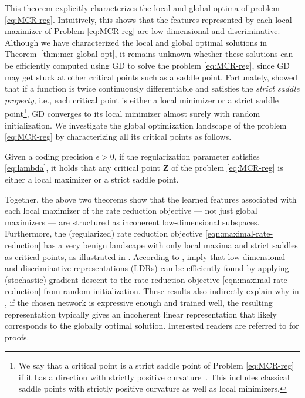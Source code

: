 \documentclass[../../book-main.tex]{subfiles}
\begin{document}
This theorem explicitly characterizes the local and global optima of problem \eqref{eq:MCR-reg}. Intuitively, this shows that the features represented by each local maximizer of Problem \eqref{eq:MCR-reg} are low-dimensional and discriminative. Although we have characterized the local and global optimal solutions in Theorem~\ref{thm:mcr-global-opt}, it remains unknown whether these solutions can be efficiently computed using GD to solve the problem \eqref{eq:MCR-reg}, since GD may get stuck at other critical points such as a saddle point.
Fortunately, \cite{sun2015nonconvex,lee2016gradient} showed that if a function is twice continuously differentiable and satisfies the {\em strict saddle property}, i.e., each critical point is either a local minimizer or a strict saddle point\footnote{We say that a critical point is a strict saddle point of Problem \eqref{eq:MCR-reg} if it has a direction with strictly positive curvature~\cite{sun2015nonconvex}. This includes classical saddle points with strictly positive curvature as well as local minimizers.}, GD converges to its local minimizer almost surely with random initialization. We investigate the global optimization landscape of the problem \eqref{eq:MCR-reg} by characterizing all its critical points as follows.

 \begin{theorem}\label{thm:mcr-benign-opt-landscape}
	Given a coding precision $\epsilon > 0$, if the regularization parameter satisfies \eqref{eq:lambda},
	it holds that any critical point $\bm Z$ of the problem \eqref{eq:MCR-reg} is either a local maximizer or a strict saddle point.
\end{theorem}
Together, the above two theorems
show that the learned features associated with each local maximizer of the rate
reduction objective --- not just global maximizers --- are structured as incoherent low-dimensional subspaces. Furthermore, the (regularized) rate reduction objective \eqref{eqn:maximal-rate-reduction} has a very benign landscape with only local maxima and strict saddles as critical points, as illustrated in . 
According to \cite{sun2015nonconvex,lee2016gradient},  imply that low-dimensional and discriminative representations (LDRs) can be efficiently found by applying (stochastic) gradient descent to the rate reduction objective \eqref{eqn:maximal-rate-reduction} from random initialization. These results also indirectly explain why in , if the chosen network is expressive enough and trained well, the resulting representation typically gives an incoherent linear representation that likely corresponds to the globally optimal solution.
Interested readers are referred to \cite{wang2024global} for proofs. 
\end{document}
